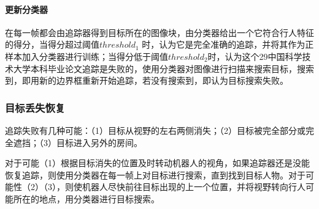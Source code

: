 \paragraph{更新分类器}

  在每一帧都会由追踪器得到目标所在的图像块，由分类器给出一个它符合行人特征的得分，当得分超过阈值$threshold_1$ 时，认为它是完全准确的追踪，并将其作为正样本加入分类器进行训练；当得分低于阈值$threshold_2$时，认为这个29中国科学技术大学本科毕业论文追踪是失败的，使用分类器对图像进行扫描来搜索目标，搜索到，即用新的边界框重新开始追踪，若没有搜索到，即认为目标搜索失败。

\subsubsection{目标丢失恢复}

  追踪失败有几种可能：（1）目标从视野的左右两侧消失；（2）目标被完全部分或完全遮挡；（3）目标进入另外的房间。

  对于可能（1）根据目标消失的位置及时转动机器人的视角，如果追踪器还是没能恢复追踪，则使用分类器在每一帧上对目标进行搜索，直到找到目标人物。对于可能性（2）（3），则使机器人尽快前往目标出现的上一个位置，并将视野转向行人可能所在的地点，用分类器进行目标搜索。